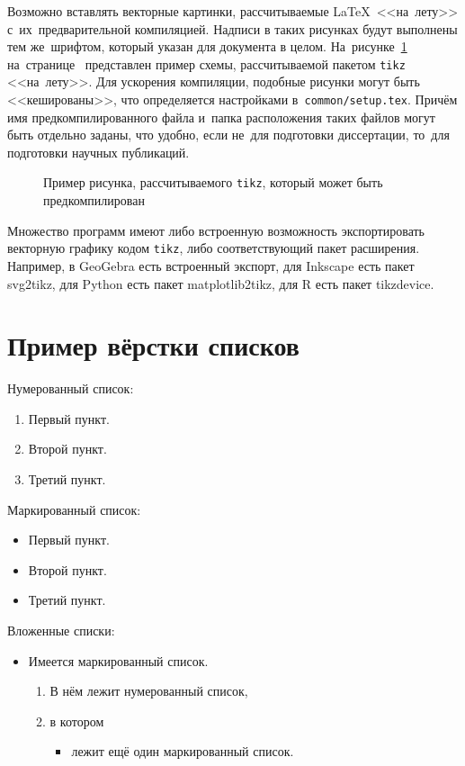 Возможно вставлять векторные картинки, рассчитываемые \LaTeX\ <<на~лету>>
с~их~предварительной компиляцией. Надписи в таких рисунках будут выполнены
тем же~шрифтом, который указан для документа в целом.
На~рисунке~\cref{fig:tikz_example} на~странице~\pageref{fig:tikz_example}
представлен пример схемы, рассчитываемой пакетом \verb|tikz| <<на~лету>>.
Для ускорения компиляции, подобные рисунки могут быть <<кешированы>>, что
определяется настройками в~\verb|common/setup.tex|.
Причём имя предкомпилированного
файла и~папка расположения таких файлов могут быть отдельно заданы,
что удобно, если не~для подготовки диссертации,
то~для подготовки научных публикаций.
\begin{figure}[ht]
    \legend{}
    \caption[Пример \texttt{tikz} схемы]{Пример рисунка, рассчитываемого
        \texttt{tikz}, который может быть предкомпилирован}\label{fig:tikz_example}
\end{figure}

Множество программ имеют либо встроенную возможность экспортировать векторную
графику кодом \verb|tikz|, либо соответствующий пакет расширения.
Например, в GeoGebra есть встроенный экспорт,
для Inkscape есть пакет svg2tikz,
для Python есть пакет matplotlib2tikz,
для R есть пакет tikzdevice.

\section{Пример вёрстки списков}\label{sec:ch2/sec3}

\noindent Нумерованный список:
\begin{enumerate}
  \item Первый пункт.
  \item Второй пункт.
  \item Третий пункт.
\end{enumerate}

\noindent Маркированный список:
\begin{itemize}
  \item Первый пункт.
  \item Второй пункт.
  \item Третий пункт.
\end{itemize}

\noindent Вложенные списки:
\begin{itemize}
  \item Имеется маркированный список.
  \begin{enumerate}
    \item В нём лежит нумерованный список,
    \item в котором
    \begin{itemize}
      \item лежит ещё один маркированный список.
    \end{itemize}
  \end{enumerate}
\end{itemize}

